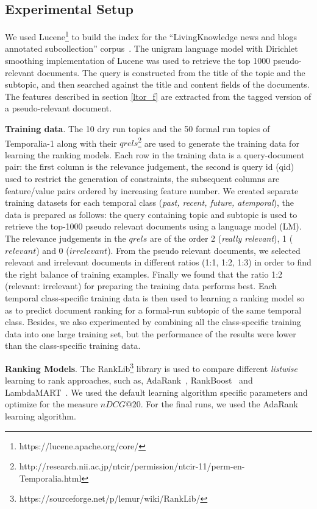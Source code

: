 \documentclass{sig-alternate}
\begin{document}
\subsection{Experimental Setup}
We used Lucene\footnote{https://lucene.apache.org/core/} to build the index for the ``LivingKnowledge news and blogs annotated subcollection'' corpus~\cite{mioverview}. The unigram language model with Dirichlet smoothing implementation of Lucene was used to retrieve the top 1000 pseudo-relevant documents. The query is constructed from the title of the topic and the subtopic, and then searched against the title and content fields of the documents. The features described in section \ref{ltor_f} are extracted from the tagged version of a pseudo-relevant document.

\textbf{Training data}. The 10 dry run topics and the 50 formal run topics of Temporalia-1 along with their $qrels$\footnote{http://research.nii.ac.jp/ntcir/permission/ntcir-11/perm-en-Temporalia.html} are used to generate the training data for learning the ranking models. Each row in the training data is a query-document pair: the first column is the relevance judgement, the second is query id (qid) used to restrict the generation of constraints, the subsequent columns are feature/value pairs ordered by increasing feature number. We created separate training datasets for each temporal class (\textit{past, recent, future, atemporal}), the data is prepared as follows: the query containing topic and subtopic is used to retrieve the top-1000 pseudo relevant documents using a language model (LM). The relevance judgements in the $qrels$ are of the order 2 (\textit{really relevant}), 1 ($relevant$) and 0 ($irrelevant$). From the pseudo relevant documents, we selected relevant and irrelevant documents in different ratios (1:1, 1:2, 1:3) in order to find the right balance of training examples. Finally we found that the ratio 1:2 (relevant: irrelevant) for preparing the training data performs best. Each temporal class-specific training data is then used to learning a ranking model so as to predict document ranking for a formal-run subtopic of the same temporal class. Besides, we also experimented by combining all the class-specific training data into one large training set, but the performance of the results were lower than the class-specific training data.

\textbf{Ranking Models}. The RankLib\footnote{https://sourceforge.net/p/lemur/wiki/RankLib/} library is used to compare different \textit{listwise} learning to rank approaches, such as, AdaRank~\cite{adarank}, RankBoost~\cite{rankboost} and LambdaMART~\cite{lambdamart}. We used the default learning algorithm specific parameters and optimize for the measure $nDCG@20$. For the final runs, we used the AdaRank learning algorithm.
\end{document}
